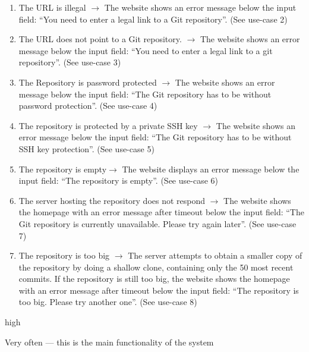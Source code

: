 \documentclass[11pt]{scrartcl}
\begin{document}
\begin{description}[leftmargin=!,labelwidth=\widthof{\bfseries Frequency of use:}]
	\item[Exceptions:]
		\begin{enumerate}[leftmargin=1.5em]
			\item The URL is illegal $\rightarrow$ The website shows an error message below the 						input field: \enquote{You need to enter a legal link to a Git repository}. (See use-case 				2)
			\item The URL does not point to a Git repository. $\rightarrow$  The website
				shows an error message below the input field: \enquote{You need to enter a legal 		
				link to a git repository}. (See use-case 3)
			\item The Repository is password protected $\rightarrow$ The website shows an
				error message below the input field: \enquote{The Git repository has to be without 
				password protection}. (See use-case 4)
			\item The repository is protected by a private SSH key $\rightarrow$ The
				website shows an error message below the input field: \enquote{The Git repository 
				has to be without SSH key protection}. (See use-case 5)
			\item The repository is empty$\rightarrow$ The website displays an error
				message below the input field: \enquote{The repository is empty}. (See use-case 6)
			\item The server hosting the repository does not respond $\rightarrow$ The
				website shows the homepage with an error message after timeout below the input 	
				field: 	\enquote{The Git repository is currently unavailable. Please try again later}.  
				(See use-case 7)
			\item The repository is too big $\rightarrow$  The server attempts to obtain a
				smaller copy of the repository by doing a shallow clone, containing only
				the 50 most recent commits. If the repository is still too big, the
				website shows the homepage with an error message after timeout below the input 	
				field: \enquote{The repository is too big. Please try another one}. (See use-case 8)
		\end{enumerate}

	\item[Priority:] high
	\item[Frequency of use:] Very often --- this is the main functionality of the system

\end{description}
\end{document}
